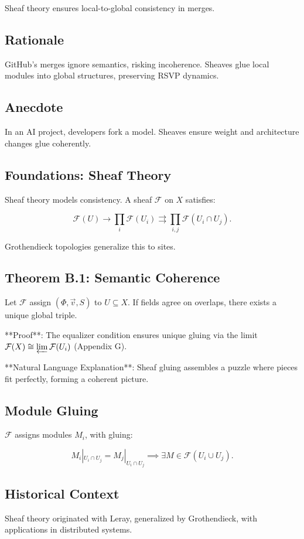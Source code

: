 \documentclass[12pt]{article}
\begin{document}
Sheaf theory ensures local-to-global consistency in merges.

\subsection{Rationale}
GitHub’s merges ignore semantics, risking incoherence. Sheaves glue local modules into global structures, preserving RSVP dynamics.

\subsection{Anecdote}
In an AI project, developers fork a model. Sheaves ensure weight and architecture changes glue coherently.

\subsection{Foundations: Sheaf Theory}
Sheaf theory \cite{mac2013categories} models consistency. A sheaf $\mathcal{F}$ on $X$ satisfies:

\[
\mathcal{F}(U) \to \prod_i \mathcal{F}(U_i) \rightrightarrows \prod_{i,j} \mathcal{F}(U_i \cap U_j).
\]

Grothendieck topologies generalize this to sites.

\subsection{Theorem B.1: Semantic Coherence}
Let $\mathcal{F}$ assign $(\Phi, \vec{v}, S)$ to $U \subseteq X$. If fields agree on overlaps, there exists a unique global triple.

**Proof**: The equalizer condition ensures unique gluing via the limit $\mathcal{F}(X) \cong \varprojlim \mathcal{F}(U_i)$ \cite{mac2013categories} (Appendix G).

**Natural Language Explanation**: Sheaf gluing assembles a puzzle where pieces fit perfectly, forming a coherent picture.

\subsection{Module Gluing}
$\mathcal{F}$ assigns modules $M_i$, with gluing:

\[
M_i|_{U_i \cap U_j} = M_j|_{U_i \cap U_j} \implies \exists M \in \mathcal{F}(U_i \cup U_j).
\]

\subsection{Historical Context}
Sheaf theory originated with Leray, generalized by Grothendieck, with applications in distributed systems.
\end{document}
